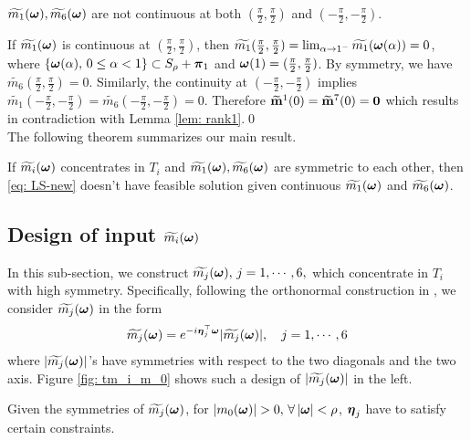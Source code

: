 \begin{proposition}
$\widetilde{m_{1}}(\boldsymbol{\omega}),\widetilde{m_{6}}(\boldsymbol{\omega})$ are not continuous at both $(\frac{\pi}{2},\frac{\pi}{2})$ and $(-\frac{\pi}{2},-\frac{\pi}{2})$.
\end{proposition}
If $\widetilde{m_{1}}(\boldsymbol{\omega})$ is continuous at $(\frac{\pi}{2},\frac{\pi}{2})$, then $\widetilde{m_1}(\frac{\pi}{2},\frac{\pi}{2}) = \lim_{\alpha\rightarrow 1^-}\widetilde{m_1}(\boldsymbol{\omega}(\alpha)) = 0$, where $\{\boldsymbol{\omega}(\alpha),\,0\leq \alpha<1\} \subset S_\rho + \boldsymbol{\pi}_1$ and $\boldsymbol{\omega}(1) = (\frac{\pi}{2},\frac{\pi}{2})$. By symmetry, we have $\widetilde{m_6}(\frac{\pi}{2},\frac{\pi}{2}) = 0$. Similarly, the continuity at $(-\frac{\pi}{2},-\frac{\pi}{2})$ implies $\widetilde{m_1}(-\frac{\pi}{2},-\frac{\pi}{2}) = \widetilde{m_6}(-\frac{\pi}{2},-\frac{\pi}{2}) = 0$. Therefore $\widetilde{\mathbf{m}}^{1}(0) = \widetilde{\mathbf{m}}^{7}(0) = \mathbf{0}$ which results in contradiction with Lemma \ref{lem: rank1}.\qed\\[1em]%
The following theorem summarizes our main result.
\begin{theorem}\label{thm: thm}
If  $\widetilde{m_{i}}(\boldsymbol{\omega})$ concentrates in $T_i$ and $\widetilde{m_{1}}(\boldsymbol{\omega}),\widetilde{m_{6}}(\boldsymbol{\omega})$ are symmetric to each other,  then  \eqref{eq: LS-new} doesn't have feasible solution given continuous $\widetilde{m_{1}}(\boldsymbol{\omega})$ and $\widetilde{m_{6}}(\boldsymbol{\omega})$.
\end{theorem}

\subsection{Design of input $\widetilde{m_{i}}(\boldsymbol{\omega})$}\label{sec: phase-design}
In this sub-section, we construct $\widetilde{m_{j}}(\boldsymbol{\omega}),\, j = 1,\cdots,6,$ which concentrate in $T_i$ with high symmetry.
Specifically, following the orthonormal construction in \cite{yin2014orthshear}, we consider $\widetilde{m_{j}}(\boldsymbol{\omega})$ in the form 
\begin{align}\label{eq: m-form}
\widetilde{m_{j}}(\boldsymbol{\omega}) = e^{-i\boldsymbol{\eta}_j^\top\boldsymbol{\omega}}|\widetilde{m_{j}}(\boldsymbol{\omega})|,\quad j = 1,\cdots,6
\end{align}
 where $|\widetilde{m_{j}}(\boldsymbol{\omega})|$'s have symmetries with respect to the two diagonals and the two axis. Figure \ref{fig: tm_i_m_0} shows such a design of $|\widetilde{m_{j}}(\boldsymbol{\omega})|$ in the left.
 
Given the symmetries of $\widetilde{m_{j}}(\boldsymbol{\omega})$, for $|m_0(\boldsymbol{\omega})| > 0,\, \forall\, |\boldsymbol{\omega}| < \rho$, $\boldsymbol{\eta}_j$ have to satisfy certain constraints.
 
